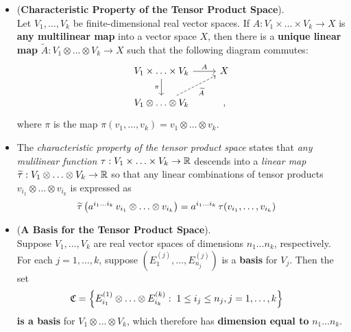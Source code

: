 \documentclass[11pt]{article}
\begin{document}
\begin{itemize}
\item \begin{proposition} (\textbf{Characteristic Property of the Tensor Product Space}).\\
Let  $V_1,\ldots,V_k$ be finite-dimensional real vector spaces. If $A: V_1\times \ldots \times V_k \rightarrow X$ is \textbf{any multilinear map} into a vector space $X$, then there is a \textbf{unique linear map} $\widetilde{A}: V_1\otimes \ldots \otimes V_k \rightarrow X$ such that the following diagram commutes:
\begin{equation}
  \begin{tikzcd}
    V_1\times \ldots \times V_k  \arrow{r}{A}  \arrow[swap]{d}{\pi}  & X  \\
    V_1\otimes \ldots \otimes V_k \arrow[ur,  dashrightarrow, swap, "\widetilde{A}"] &,  
  \end{tikzcd} \label{eqn: diagram_tensor_product}
\end{equation} where $\pi$ is the map $\pi(v_1, \ldots, v_k) = v_1 \otimes \ldots \otimes v_k$.
\end{proposition}

\item \begin{remark}
The \emph{characteristic property of the tensor product space} states that \emph{any mulilinear function} $\tau: V_1\times \ldots \times V_k \rightarrow {\mathbb R}$ descends into a \emph{linear map} $\widetilde{\tau}:V_1\otimes \ldots \otimes V_k \rightarrow {\mathbb R}$ so that any linear combinations of tensor products $v_{i_1} \otimes \ldots \otimes v_{i_k}$ is expressed as
\begin{align*}
\widetilde{\tau}\left(a^{i_1\ldots i_k}\,v_{i_1} \otimes \ldots \otimes v_{i_k}\right) &= a^{i_1\ldots i_k}\,\tau(v_{i_1}, \ldots, v_{i_k})
\end{align*}
\end{remark}

\item \begin{proposition} (\textbf{A Basis for the Tensor Product Space}).\\
Suppose $V_1,\ldots,V_k$ are real vector spaces of dimensions $n_1 \ldots  n_k$, respectively. For each $j = 1,\ldots,k$, suppose $(E_1^{(j)},\ldots, E_{n_j}^{(j)})$ is a \textbf{basis} for $V_j$. Then the set
\begin{align*}
\mathfrak{C}&= \left\{E^{(1)}_{i_1} \otimes \ldots \otimes E^{(k)}_{i_k}: \; 1 \le i_j \le n_j, j=1,\ldots, k\right\}
\end{align*} \textbf{is a basis} for $V_1\otimes \ldots \otimes V_k$, which therefore has \textbf{dimension equal to} $n_1 \ldots  n_k$.
\end{proposition}


\end{itemize}
\end{document}
